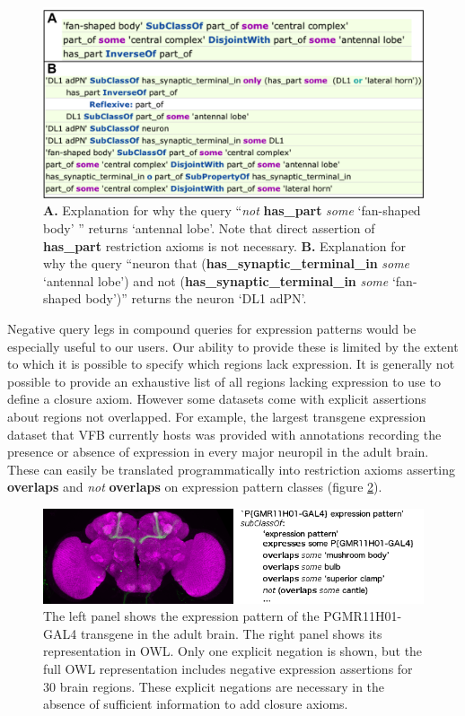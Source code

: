 \documentclass[runningheads,a4paper]{llncs}
\begin{document}
\begin{figure}
\centering
\includegraphics[width=120mm]{images/combined_explanation.png}
\caption{\textbf{A.} Explanation for why the query ``\textit{not}
   \textbf{has\_part} \textit{some} `fan-shaped body' '' returns
   `antennal lobe'.  Note that direct assertion of \textbf{has\_part}
   restriction axioms is not necessary. \textbf{B.} Explanation for
   why the query ``neuron that (\textbf{has\_synaptic\_terminal\_in}
   \textit{some} `antennal lobe') and not
   (\textbf{has\_synaptic\_terminal\_in} \textit{some} `fan-shaped
   body')'' returns the neuron `DL1 adPN'. }
\label{fig:combined_explanation}
\end{figure}

Negative query legs in compound queries for expression patterns would
be especially useful to our users.  Our ability to provide these is
limited by the extent to which it is possible to specify which regions
lack expression.  It is generally not possible to provide an
exhaustive list of all regions lacking
expression to use to define a closure axiom.  However some datasets
come with explicit assertions about regions not overlapped.  For
example, the largest transgene expression dataset that VFB currently
hosts \cite{pmid23063364} was provided with annotations recording the
presence or absence of expression in every major neuropil in the adult
brain.  These can easily be translated programmatically into restriction axioms
asserting \textbf{overlaps} and \textit{not} \textbf{overlaps} on
expression pattern classes (figure \ref{fig:exp_pat_neg}).

\begin{figure}
\centering
\includegraphics[width=120mm]{images/expression_pattern_with_neg.png}
\caption{The left panel shows the expression pattern of the
  P{GMR11H01-GAL4} transgene in the adult brain.  The right panel
  shows its representation in OWL. Only one explicit negation is shown,
  but the full OWL representation includes negative expression
  assertions for 30 brain regions.  These explicit negations are
  necessary in the absence of sufficient information to add closure axioms.}
\label{fig:exp_pat_neg}
\end{figure}
\end{document}
